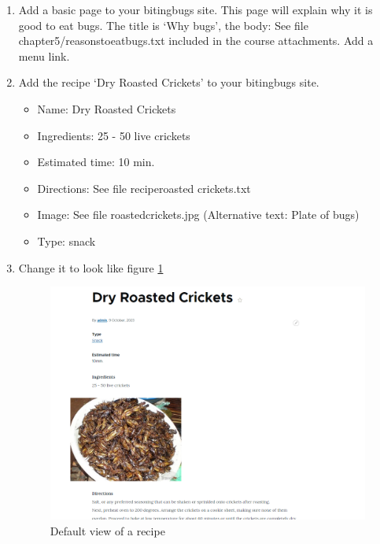 \begin{enumerate}
    \item Add a basic page to your bitingbugs site. This page will explain why it is good to eat bugs. The title is ‘Why bugs’, the body: See file chapter5/reasonstoeatbugs.txt included in the course attachments. Add a menu link.
    
   \item	Add the recipe ‘Dry Roasted Crickets’ to your bitingbugs site.
    
    \begin{itemize}
        \item Name: Dry Roasted Crickets
        \item Ingredients: 25 - 50 live crickets
        \item Estimated time: 10 min.
        \item Directions: See file recipe\textunderscore roasted \textunderscore crickets.txt
        \item Image: See file roasted\textunderscore crickets.jpg (Alternative text: Plate of bugs)
        \item Type: snack 
    \end{itemize}

    
    \item Change it to look like figure \ref{fig:bb_recipe}
    
    \begin{figure}[h]
        \centering
        \includegraphics[width=1\linewidth]{img/ch5/bb_recipe}
        \caption{Default view of a recipe}
        \label{fig:bb_recipe}
    \end{figure}
    

\end{enumerate}
